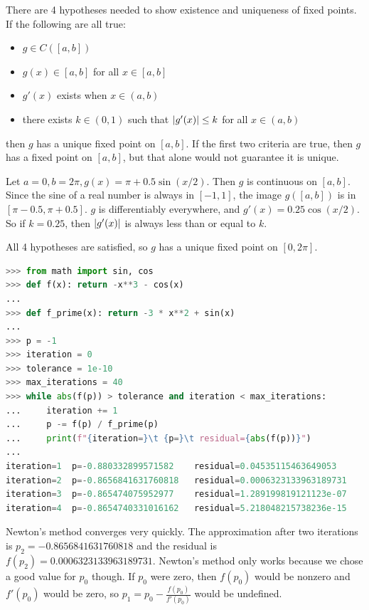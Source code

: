 \documentclass{article}
\begin{document}
\bigskip
\begin{prob}
\end{prob}
There are 4 hypotheses needed to show existence and uniqueness of fixed points. If the following are all true:
\begin{itemize}
    \item $g \in C([a,b])$
    \item $g(x) \in [a,b]$ for all $x \in [a,b]$
    \item $g'(x)$ exists when $x \in (a,b)$
    \item there exists $k \in (0, 1)$ such that $\left\lvert g'(x) \right\rvert \leq k$ for all $x \in (a,b)$
\end{itemize}
then $g$ has a unique fixed point on $[a,b]$. If the first two criteria are true, then $g$ has a fixed point on $[a,b]$, but that alone would not guarantee it is unique.
\par
Let $a = 0, b = 2 \pi, g(x) = \pi + 0.5 \sin (x/2)$. Then $g$ is continuous on $[a,b]$. Since the sine of a real number is always in $[-1, 1]$, the image $g([a,b])$ is in $[\pi -0.5, \pi + 0.5]$. $g$ is differentiably everywhere, and $g'(x) = 0.25 \cos(x/2)$. So if $k = 0.25$, then $\left\lvert g'(x) \right\rvert$ is always less than or equal to $k$.
\par
All 4 hypotheses are satisfied, so $g$ has a unique fixed point on $[0, 2\pi]$.

\bigskip
\begin{prob}
\end{prob}
\begin{lstlisting}[language=Python]
>>> from math import sin, cos
>>> def f(x): return -x**3 - cos(x)
... 
>>> def f_prime(x): return -3 * x**2 + sin(x)
... 
>>> p = -1
>>> iteration = 0
>>> tolerance = 1e-10
>>> max_iterations = 40
>>> while abs(f(p)) > tolerance and iteration < max_iterations:
...     iteration += 1
...     p -= f(p) / f_prime(p)
...     print(f"{iteration=}\t {p=}\t residual={abs(f(p))}")
... 
iteration=1	 p=-0.880332899571582	 residual=0.04535115463649053
iteration=2	 p=-0.8656841631760818	 residual=0.0006323133963189731
iteration=3	 p=-0.865474075952977	 residual=1.289199819121123e-07
iteration=4	 p=-0.8654740331016162	 residual=5.218048215738236e-15
\end{lstlisting}
\bigskip
Newton's method converges very quickly. The approximation after two iterations is $p_2 = -0.8656841631760818$ and the residual is $f(p_2) = 0.0006323133963189731$. Newton's method only works because we chose a good value for $p_0$ though. If $p_0$ were zero, then $f(p_0)$ would be nonzero and $f'(p_0)$ would be zero, so $p_1 = p_0 - \frac{f(p_0)}{f'(p_0)}$ would be undefined.
\end{document}
